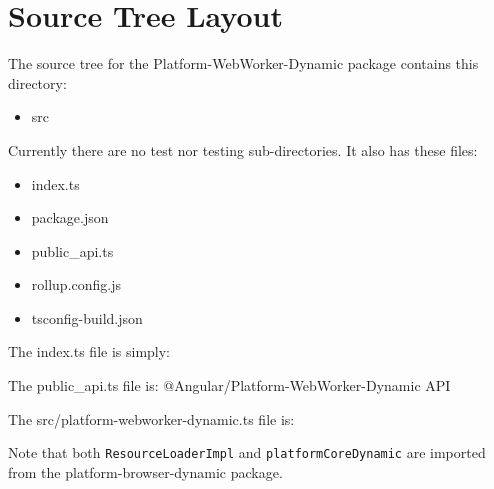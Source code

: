 \section{Source Tree Layout}

The source tree for the Platform-WebWorker-Dynamic package contains this directory:

\begin{itemize}
  \item src
\end{itemize}

Currently there are no test nor testing sub-directories. It also has these files:

\begin{itemize}
  \item index.ts
  \item package.json
  \item public\_api.ts
  \item rollup.config.js
  \item tsconfig-build.json
\end{itemize}

The index.ts file is simply:



The public\_api.ts file is:
@Angular/Platform-WebWorker-Dynamic API



The src/platform-webworker-dynamic.ts file is:



Note that both
\texttt{ResourceLoaderImpl}
and
\texttt{platformCoreDynamic}
are imported from
the platform-browser-dynamic package.

